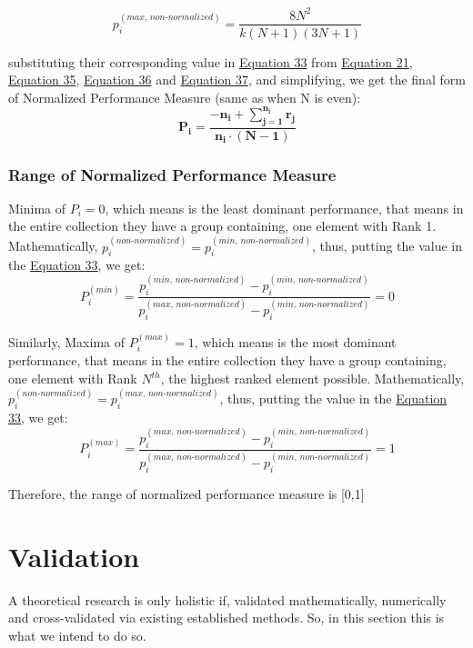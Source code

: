 \documentclass[man,floatsintext]{apa7}
\begin{document}
\begin{equation}
	\label{eq:maxima-odd}
	p_i^{(max, \, non\text{-}normalized)} = \frac{8N^2}{k (N+1)(3N+1)}
\end{equation}

substituting their corresponding value in \hyperref[eq:normalized-simpler]{Equation 33} from \hyperref[p-non-normalized]{Equation 21},  
\hyperref[eq:even-SUDH-odd]{Equation 35}, \hyperref[eq:minima-odd]{Equation 36} and \hyperref[eq:maxima-odd]{Equation 37}, and simplifying, we get the final form of Normalized Performance Measure (same as when N is even):
\begin{equation}
	\boxed{
		\mathbf{
			P_i = \frac{-n_i +  \sum\limits_{j=1}^{n_i} r_j}{n_i \cdot (N - 1)}}
	}
\end{equation}


\subsubsection{Range of Normalized Performance Measure}
Minima of $P_i = 0$, which means is the least dominant performance, that means in the entire collection they have a group containing, one element with Rank 1. Mathematically, $p_i^{(non\text{-}normalized)} =  p_i^{(min, \, non\text{-}normalized)}$, thus, putting the value in the \hyperref[eq:normalized-simpler]{Equation 33}, we get:
\begin{equation}
	P_i^{(min)} = \frac{p_i^{(min, \, non\text{-}normalized)} - p_i^{(min, \, non\text{-}normalized)}}{p_i^{(max, \, non\text{-}normalized)} - p_i^{(min, \, non\text{-}normalized)}} = 0
\end{equation}

Similarly,
Maxima of $P_i^{(max)} = 1$, which means is the most dominant performance, that means in the entire collection they have a group containing, one element with Rank $N^{th}$, the highest ranked element possible. Mathematically, $p_i^{(non\text{-}normalized)} =  p_i^{(max, \, non\text{-}normalized)}$, thus, putting the value in the \hyperref[eq:normalized-simpler]{Equation 33}, we get:
\begin{equation}
	P_i^{(max)} = \frac{p_i^{(max, \, non\text{-}normalized)} - p_i^{(min, \, non\text{-}normalized)}}{p_i^{(max, \, non\text{-}normalized)} - p_i^{(min, \, non\text{-}normalized)}} = 1
\end{equation}

Therefore, the range of normalized performance measure is [0,1]


\section{Validation}
A theoretical research is only holistic if, validated mathematically, numerically and cross-validated via existing established methods. So, in this section this is what we intend to do so.
\end{document}
